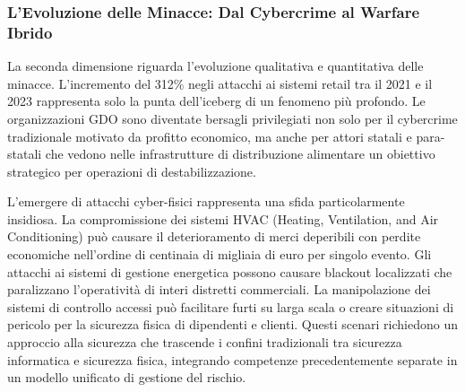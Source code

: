 \subsubsection{L'Evoluzione delle Minacce: Dal Cybercrime al Warfare Ibrido}

La seconda dimensione riguarda l'evoluzione qualitativa e quantitativa delle minacce. L'incremento del 312\% negli attacchi ai sistemi retail tra il 2021 e il 2023\autocite{enisa2024retail} rappresenta solo la punta dell'iceberg di un fenomeno più profondo. Le organizzazioni GDO sono diventate bersagli privilegiati non solo per il cybercrime tradizionale motivato da profitto economico, ma anche per attori statali e para-statali che vedono nelle infrastrutture di distribuzione alimentare un obiettivo strategico per operazioni di destabilizzazione.

L'emergere di attacchi cyber-fisici rappresenta una sfida particolarmente insidiosa. La compromissione dei sistemi HVAC (Heating, Ventilation, and Air Conditioning) può causare il deterioramento di merci deperibili con perdite economiche nell'ordine di centinaia di migliaia di euro per singolo evento. Gli attacchi ai sistemi di gestione energetica possono causare blackout localizzati che paralizzano l'operatività di interi distretti commerciali. La manipolazione dei sistemi di controllo accessi può facilitare furti su larga scala o creare situazioni di pericolo per la sicurezza fisica di dipendenti e clienti. Questi scenari richiedono un approccio alla sicurezza che trascende i confini tradizionali tra sicurezza informatica e sicurezza fisica, integrando competenze precedentemente separate in un modello unificato di gestione del rischio.

